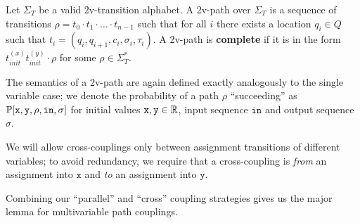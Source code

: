 \begin{defn}
    Let $\Sigma_T$ be a valid 2v-transition alphabet. A 2v-path over $\Sigma_T$ is a sequence of transitions $\rho=t_0\cdot t_1\cdot \ldots \cdot t_{n-1}$ such that for all $i$ there exists a location $q_i\in Q$ such that $t_i = (q_i, q_{i+1}, c_i, \sigma_i, \tau_i)$. A 2v-path is \textbf{complete} if it is in the form $t_{init}^{(x)}t_{init}^{(y)}\cdot \rho$ for some $\rho\in \Sigma_T^*$.
\end{defn}

The semantics of a 2v-path are again defined exactly analogously to the single variable case; we denote the probability of a path $\rho$ ``succeeding'' as $\mathbb{P}[\texttt{x}, \texttt{y}, \rho, \texttt{in}, \sigma]$ for initial values $\texttt{x}, \texttt{y}\in \mathbb{R}$, input sequence $\texttt{in}$ and output sequence $\sigma$. 


We will allow cross-couplings only between assignment transitions of different variables; to avoid redundancy, we require that a cross-coupling is \textit{from} an assignment into $\texttt{x}$ and \textit{to} an assignment into $\texttt{y}$.

Combining our ``parallel'' and ``cross'' coupling strategies gives us the major lemma for multivariable path couplings.

